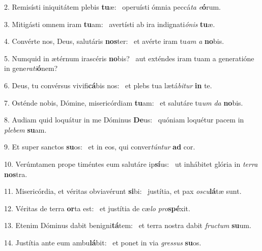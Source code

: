 2. Remisísti iniquitátem plebis \textbf{tu}æ: \ast\  operuísti ómnia peccá\textit{ta} \textit{e}\textbf{ó}rum.\

3. Mitigásti omnem iram \textbf{tu}am: \ast\  avertísti ab ira indignati\textit{ó}\textit{nis} \textbf{tu}æ.\

4. Convérte nos, Deus, salutáris \textbf{nos}ter: \ast\  et avérte iram tu\textit{am} \textit{a} \textbf{no}bis.\

5. Numquid in ætérnum irascéris \textbf{no}bis? \ast\  aut exténdes iram tuam a generatióne in gene\textit{ra}\textit{ti}\textbf{ó}nem?\

6. Deus, tu convérsus vivifi\textbf{cá}bis nos: \ast\  et plebs tua lætá\textit{bi}\textit{tur} \textbf{in} te.\

7. Osténde nobis, Dómine, misericórdiam \textbf{tu}am: \ast\  et salutáre tu\textit{um} \textit{da} \textbf{no}bis.\

8. Audiam quid loquátur in me Dóminus \textbf{De}us: \ast\  quóniam loquétur pacem in \textit{ple}\textit{bem} \textbf{su}am.\

9. Et super sanctos \textbf{su}os: \ast\  et in eos, qui conver\textit{tún}\textit{tur} \textbf{ad} cor.\

10. Verúmtamen prope timéntes eum salutáre ip\textbf{sí}us: \ast\  ut inhábitet glória in \textit{ter}\textit{ra} \textbf{nos}tra.\

11. Misericórdia, et véritas obviavérunt \textbf{si}bi: \ast\  justítia, et pax \textit{os}\textit{cu}\textbf{lá}tæ sunt.\

12. Véritas de terra \textbf{or}ta est: \ast\  et justítia de cæ\textit{lo} \textit{pro}\textbf{spé}xit.\

13. Etenim Dóminus dabit benigni\textbf{tá}tem: \ast\  et terra nostra dabit \textit{fruc}\textit{tum} \textbf{su}um.\

14. Justítia ante eum ambu\textbf{lá}bit: \ast\  et ponet in via \textit{gres}\textit{sus} \textbf{su}os.\

